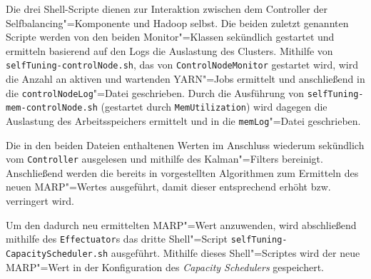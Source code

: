 Die drei Shell-Scripte dienen zur Interaktion zwischen dem Controller der Selfbalancing"=Komponente und Hadoop selbst.
Die beiden zuletzt genannten Scripte werden von den beiden Monitor"=Klassen sekündlich gestartet und ermitteln basierend auf den Logs die Auslastung des Clusters.
Mithilfe von \texttt{selfTuning-controlNode.sh}, das von \texttt{ControlNodeMonitor} gestartet wird, wird die Anzahl an aktiven und wartenden YARN"=Jobs ermittelt und anschließend in die \texttt{controlNodeLog}"=Datei geschrieben.
Durch die Ausführung von \texttt{selfTuning-mem-controlNode.sh} (gestartet durch \texttt{MemUtilization}) wird dagegen die Auslastung des Arbeitsspeichers ermittelt und in die \texttt{memLog}"=Datei geschrieben.

Die in den beiden Dateien enthaltenen Werten im Anschluss wiederum sekündlich vom \texttt{Controller} ausgelesen und mithilfe des Kalman"=Filters bereinigt.
Anschließend werden die bereits in \cite{zhang2016} vorgestellten Algorithmen zum Ermitteln des neuen \ac{MARP}"=Wertes ausgeführt, damit dieser entsprechend erhöht bzw. verringert wird.

Um den dadurch neu ermittelten \ac{MARP}"=Wert anzuwenden, wird abschließend mithilfe des \texttt{Effectuator}s das dritte Shell"=Script \texttt{selfTuning-CapacityScheduler.sh} ausgeführt.
Mithilfe dieses Shell"=Scriptes wird der neue MARP"=Wert in der Konfiguration des \emph{Capacity Schedulers} gespeichert.
